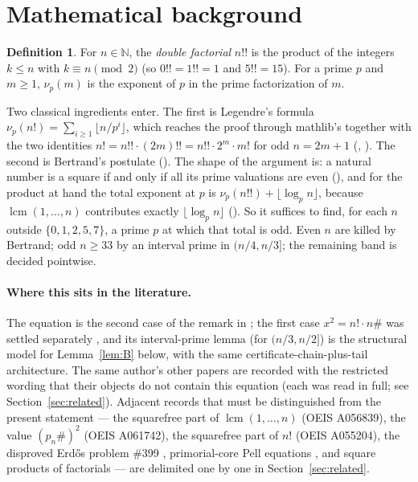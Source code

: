 \documentclass[11pt]{article}
\theoremstyle{definition}
\newtheorem{definition}[theorem]{Definition}
\begin{document}
\section{Mathematical background}\label{sec:background}

\begin{definition}\label{def:objects}
For $n \in \mathbb{N}$, the \emph{double factorial} $n!!$ is the product of
the integers $k \le n$ with $k \equiv n \pmod 2$ (so $0!! = 1!! = 1$ and
$5!! = 15$). For a prime $p$ and $m \ge 1$, $\nu_p(m)$ is the exponent of $p$
in the prime factorization of $m$.
\end{definition}

Two classical ingredients enter. The first is Legendre's formula
$\nu_p(n!) = \sum_{i \ge 1} \lfloor n/p^i \rfloor$, which reaches the proof
through mathlib's  together with the two
identities $n! = n!! \cdot (2m)!! = n!! \cdot 2^m \cdot m!$ for odd
$n = 2m+1$ (,
). The second is Bertrand's postulate
(). The shape of the argument is: a natural number is a
square if and only if all its prime valuations are even
(), and for the product at hand the
total exponent at $p$ is $\nu_p(n!!) + \lfloor \log_p n \rfloor$, because
$\operatorname{lcm}(1,\dots,n)$ contributes exactly $\lfloor \log_p n \rfloor$
(). So it suffices to find, for each $n$
outside $\{0,1,2,5,7\}$, a prime $p$ at which that total is odd. Even $n$ are
killed by Bertrand; odd $n \ge 33$ by an interval prime in $(n/4, n/3]$; the
remaining band is decided pointwise.

\paragraph{Where this sits in the literature.} The equation is the second case
of the remark in \cite{novakovic2026}; the first case $x^2 = n! \cdot n\#$ was
settled separately \cite{nfactpaper}, and its
interval-prime lemma (for $(n/3, n/2]$) is the structural model for
Lemma~\ref{lem:B} below, with the same certificate-chain-plus-tail
architecture. The same author's other papers
\cite{novakovic2025,novakovic2026b,novakovic2026c,novakovic2026d} are recorded
with the restricted wording that their objects do not contain this equation
(each was read in full; see Section~\ref{sec:related}). Adjacent records that
must be distinguished from the present statement --- the squarefree part of
$\operatorname{lcm}(1,\dots,n)$ (OEIS A056839), the value $(p_n\#)^2$ (OEIS
A061742), the squarefree part of $n!$ (OEIS A055204), the disproved
Erd\H{o}s problem \#399 \cite{erdos399}, primorial-core Pell equations
\cite{peixoto2026}, and square products of factorials \cite{yudin2026} --- are
delimited one by one in Section~\ref{sec:related}.
\end{document}
